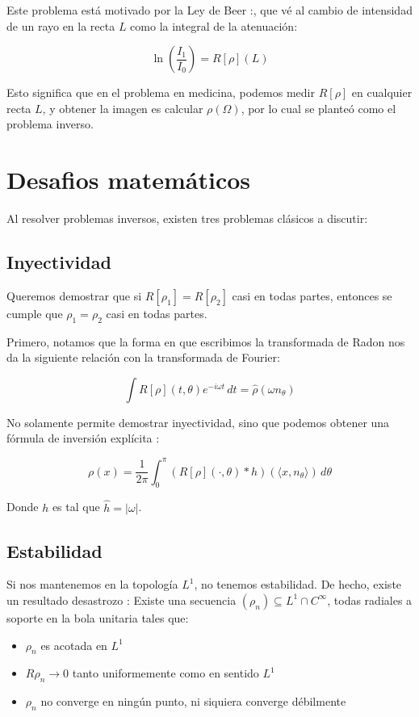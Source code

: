Este problema está motivado por la Ley de Beer \citep{ketcham}:, que vé al cambio de intensidad de un rayo en la recta $L$ como la integral de la atenuación:

\[
\ln(\frac{I_1}{I_0}) = R[\rho](L)
\]

Esto significa que en el problema en medicina, podemos medir $R[\rho]$ en cualquier recta $L$, y obtener la imagen es calcular $\rho(\Omega)$, por lo cual se planteó como el problema inverso.

\section{Desafios matemáticos}
Al resolver problemas inversos, existen tres problemas clásicos a discutir:
\subsection{Inyectividad}
Queremos demostrar que si $R[\rho_1] = R[\rho_2]$ casi en todas partes, entonces se cumple que $\rho_1 = \rho_2$ casi en todas partes.

Primero, notamos que la forma en que escribimos la transformada de Radon nos da la siguiente relación con la transformada de Fourier:

\[
\int R[\rho](t, \theta)e^{-i\omega t} \, dt = \hat{\rho}(\omega n_\theta)
\]

No solamente permite demostrar inyectividad, sino que podemos obtener una fórmula de inversión explícita \citep{candes_inverse}:

\[
\rho(x) = \frac{1}{2\pi}\int_0^\pi (R[\rho](\cdot, \theta)*h)(\langle x, n_\theta\rangle)\, d\theta
\]

Donde $h$ es tal que $\hat{h} = |\omega|$. 

\subsection{Estabilidad}
Si nos mantenemos en la topología $L^1$, no tenemos estabilidad. De hecho, existe un resultado desastrozo \citep{herman_natterer_1981}: Existe una secuencia $(\rho_n)\subseteq L^1\cap C^\infty$, todas radiales a soporte en la bola unitaria tales que:

\begin{itemize}
    \item $\rho_n$ es acotada en $L^1$
    \item $R\rho_n\to 0$ tanto uniformemente como en sentido $L^1$
    \item $\rho_n$ no converge en ningún punto, ni siquiera converge débilmente
\end{itemize}

